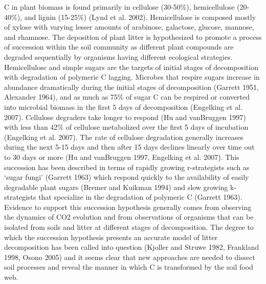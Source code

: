 C in plant biomass is found primarily in cellulose (30-50\%), hemicellulose (20-40\%), and lignin (15-25\%) (Lynd et al. 2002). Hemicellulose is composed mostly of xylose with varying lesser amounts of arabinose, galactose, glucose, mannose, and rhamnose. The deposition of plant litter is hypothesized to promote a process of succession within the soil community as different plant compounds are degraded sequentially by organisms having different ecological strategies. Hemicellulose and simple sugars are the targets of initial stages of decomposition with degradation of polymeric C lagging. Microbes that respire sugars increase in abundance dramatically during the initial stages of decomposition (Garrett 1951, Alexander 1964), and as much as 75\% of sugar C can be respired or converted into microbial biomass in the first 5 days of decomposition (Engelking et al. 2007). Cellulose degraders take longer to respond (Hu and vanBruggen 1997) with less than 42\% of cellulose metabolized over the first 5 days of incubation (Engelking et al. 2007). The rate of cellulose degradation generally increases during the next 5-15 days and then after 15 days declines linearly over time out to 30 days or more (Hu and vanBruggen 1997, Engelking et al. 2007). This succession has been described in terms of rapidly growing r-strategists such as ‘sugar fungi’ (Garrett 1963) which respond quickly to the availability of easily degradable plant sugars (Bremer and Kuikman 1994) and slow growing k-strategists that specialize in the degradation of polymeric C (Garrett 1963). Evidence to support this succession hypothesis generally comes from observing the dynamics of CO2 evolution and from observations of organisms that can be isolated from soils and litter at different stages of decomposition. The degree to which the succession hypothesis presents an accurate model of litter decomposition has been called into question (Kjoller and Struwe 1982, Frankland 1998, Osono 2005) and it seems clear that new approaches are needed to dissect soil processes and reveal the manner in which C is transformed by the soil food web.  

